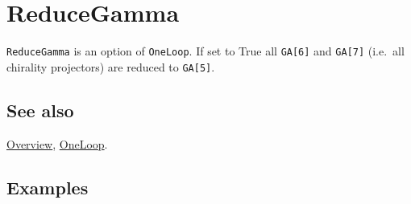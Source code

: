 \documentclass[../FeynCalcManual.tex]{subfiles}
\begin{document}
\hypertarget{reducegamma}{%
\section{ReduceGamma}\label{reducegamma}}

\texttt{ReduceGamma} is an option of \texttt{OneLoop}. If set to True
all \texttt{GA[\allowbreak{}6]} and \texttt{GA[\allowbreak{}7]}
(i.e.~all chirality projectors) are reduced to
\texttt{GA[\allowbreak{}5]}.

\subsection{See also}

\hyperlink{toc}{Overview}, \hyperlink{oneloop}{OneLoop}.

\subsection{Examples}
\end{document}
